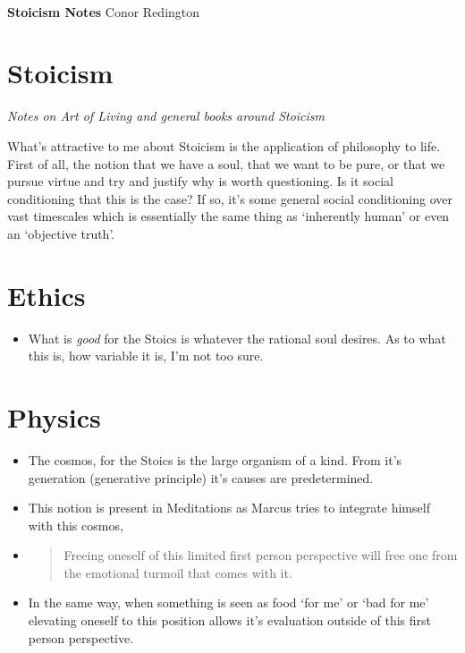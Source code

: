 \documentclass[11pt]{article}
\begin{document}
\thispagestyle{empty}
\bigskip \
\vspace{0.1cm}

\begin{center}
{\fontsize{36}{36} \selectfont \bf \sffamily Stoicism Notes}
\vskip 24pt
{\fontsize{18}{18} \selectfont \rmfamily Conor Redington} 
\vskip 24pt
\end{center}

{\parindent0pt \baselineskip=15.5pt \lipsum[1-4]}

\newpage
\microtoc
\newpage

\hypertarget{stoicism}{%
\section{Stoicism}\label{stoicism}}

\emph{Notes on Art of Living and general books around Stoicism}

What's attractive to me about Stoicism is the application of philosophy
to life. First of all, the notion that we have a soul, that we want to
be pure, or that we pursue virtue and try and justify why is worth
questioning. Is it social conditioning that this is the case? If so,
it's some general social conditioning over vast timescales which is
essentially the same thing as `inherently human' or even an `objective
truth'.

\hypertarget{ethics}{%
\section{Ethics}\label{ethics}}

\begin{itemize}
\tightlist
\item
  What is \emph{good} for the Stoics is whatever the rational soul
  desires. As to what this is, how variable it is, I'm not too sure.
\end{itemize}

\hypertarget{physics}{%
\section{Physics}\label{physics}}

\begin{itemize}
\item
  The cosmos, for the Stoics is the large organism of a kind. From it's
  generation (generative principle) it's causes are predetermined.
\item
  This notion is present in Meditations as Marcus tries to integrate
  himself with this cosmos,
\item
  \begin{quote}
  Freeing oneself of this limited first person perspective will free one
  from the emotional turmoil that comes with it.
  \end{quote}
\item
  In the same way, when something is seen as food `for me' or `bad for
  me' elevating oneself to this position allows it's evaluation outside
  of this first person perspective.
\end{itemize}
\end{document}
